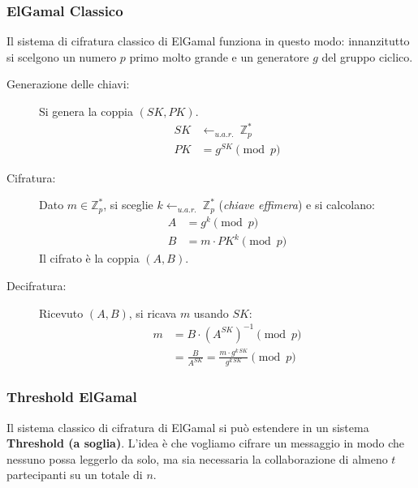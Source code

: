 \documentclass[a4paper, 11pt]{article}
\begin{document}
\subsubsection*{ElGamal Classico}

Il sistema di cifratura classico di ElGamal funziona in questo modo: innanzitutto si scelgono un numero $p$ primo molto grande e un generatore $g$ del gruppo ciclico.

\begin{description}
    \item[Generazione delle chiavi:] Si genera la coppia $(SK, PK)$.
    \begin{align*}
        SK &\gets_{u.a.r.}\ \mathbb{Z}_p^* \\
        PK &= g^{SK} \pmod{p}
    \end{align*}
    \item[Cifratura:] Dato $m \in \mathbb{Z}_p^*$, si sceglie $k \gets_{u.a.r.}\ \mathbb{Z}_p^*$ (\textit{chiave effimera}) e si calcolano:
    \begin{align*}
        A &= g^k \pmod{p} \\
        B &= m \cdot PK^k \pmod{p}
    \end{align*}
    Il cifrato è la coppia $(A, B)$.
    \item[Decifratura:] Ricevuto $(A, B)$, si ricava $m$ usando $SK$:
    \begin{align*}
        m &= B \cdot (A^{SK})^{-1} \pmod{p} \\
          &= \frac{B}{A^{SK}} = \frac{m \cdot g^{k\,SK}}{g^{k\,SK}} \pmod{p}
    \end{align*}
\end{description}

\subsubsection*{Threshold ElGamal}

Il sistema classico di cifratura di ElGamal si può estendere in un sistema \textbf{Threshold (a soglia)}. L'idea è che vogliamo cifrare un messaggio in modo che nessuno possa leggerlo da solo, ma sia necessaria la collaborazione di almeno $t$ partecipanti su un totale di $n$.
\end{document}
